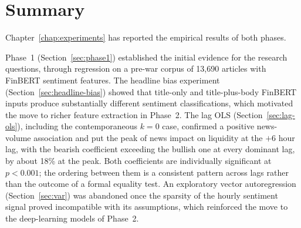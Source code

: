 \section{Summary}\label{sec:experiments-summary}

Chapter~\ref{chap:experiments} has reported the empirical results of both phases.

Phase~1 (Section~\ref{sec:phase1}) established the initial evidence for the research questions, through regression on a pre-war corpus of 13{,}690 articles with FinBERT sentiment features. The headline bias experiment (Section~\ref{sec:headline-bias}) showed that title-only and title-plus-body FinBERT inputs produce substantially different sentiment classifications, which motivated the move to richer feature extraction in Phase~2. The lag OLS (Section~\ref{sec:lag-ols}), including the contemporaneous $k=0$ case, confirmed a positive news-volume association and put the peak of news impact on liquidity at the $+6$ hour lag, with the bearish coefficient exceeding the bullish one at every dominant lag, by about 18\% at the peak. Both coefficients are individually significant at $p < 0.001$; the ordering between them is a consistent pattern across lags rather than the outcome of a formal equality test. An exploratory vector autoregression (Section~\ref{sec:var}) was abandoned once the sparsity of the hourly sentiment signal proved incompatible with its assumptions, which reinforced the move to the deep-learning models of Phase~2.


